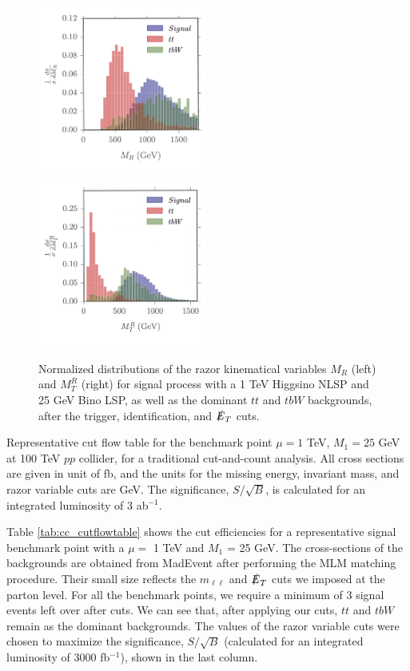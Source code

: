 \documentclass[a4paper,11pt]{article}
\begin{document}
\begin{figure}[h]
\centering
\includegraphics[trim = {0.3cm 0.6cm 0.1cm 0}, clip, width=0.496\textwidth]{images/mR_copy.png}
\includegraphics[trim = {0.3cm 0.6cm 0.1cm 0}, clip, width=0.496\textwidth]{images/mTR_copy.png}
\caption{Normalized distributions of the razor kinematical variables $M_R$
  (left) and $M_T^R$ (right) for signal process with a 1 TeV Higgsino NLSP and 25 GeV Bino LSP,  as well as the dominant $tt$ and $tbW$ backgrounds,
  after the trigger, identification, and $\slashed{E}_{T}$ cuts.}
\label{fig:razor_histos}
\end{figure}

\begin{table}[h]
  \centering
  
  \caption{Representative cut flow table for the benchmark point $\mu=1$ TeV,
    $M_1 = 25$ GeV at 100  TeV $pp$ collider, for a traditional cut-and-count analysis. All cross sections
    are given in unit of fb, and the units for the missing energy, invariant
    mass, and razor variable cuts are GeV. The significance, $S/\sqrt{B}$, is
    calculated for an integrated luminosity of 3 ab$^{-1}$.    }
\label{tab:cc_cutflowtable}
\end{table}

Table \ref{tab:cc_cutflowtable} shows the cut efficiencies for a representative
signal benchmark point with a $\mu =$ 1 TeV and $M_1$ = 25 GeV.   The
cross-sections of the backgrounds are obtained from MadEvent after performing the MLM matching procedure. Their small size reflects
the $m_{\ell\ell}$ and $\slashed{E}_T$ cuts we imposed at the parton level. For all
the benchmark points, we require a minimum of 3 signal events left over after
cuts. We can see that, after applying our cuts, $tt$ and $tbW$ remain as the
dominant backgrounds. The values of the razor variable cuts were chosen to
maximize the significance, $S/\sqrt{B}$ (calculated for an integrated luminosity
of 3000 fb$^{-1}$), shown in the last column.  
\end{document}
